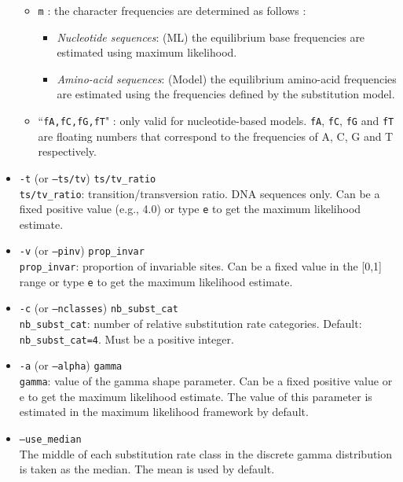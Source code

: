 \documentclass[a4paper,12pt]{article}
\newcommand{\x}[1]{\texttt{#1}}
\begin{document}
\begin{itemize}
\begin{itemize}
\item \x{m} : the character frequencies are determined as follows : 
\begin{itemize}
\item {\it Nucleotide sequences}: (ML) the equilibrium base frequencies are estimated using maximum
  likelihood.
\item {\it Amino-acid sequences}: (Model) the equilibrium amino-acid frequencies are estimated using
                 the frequencies defined by the substitution model.
\end{itemize}

\item ``\x{fA,fC,fG,fT}" : only valid for nucleotide-based models. \x{fA}, \x{fC}, \x{fG} and \x{fT} are floating numbers that 
correspond to the frequencies of A, C, G and T respectively.
\end{itemize}  

\item \x{-t} (or \x{--ts/tv}) \x{ts/tv\_ratio} \index{$\kappa$}\\
\x{ts/tv\_ratio}: transition/transversion ratio. DNA sequences only. Can be a fixed positive value
(e.g., 4.0) or type \x{e} to get the maximum likelihood estimate.

\item \x{-v} (or \x{--pinv}) \x{prop\_invar} \\
\x{prop\_invar}: proportion of invariable sites. Can be a fixed value in the [0,1] range or type \x{e} to get the maximum likelihood estimate.

\item \x{-c} (or \x{--nclasses}) \x{nb\_subst\_cat} \\
\x{nb\_subst\_cat}: number of relative substitution rate categories. Default: \x{nb\_subst\_cat=4}. Must be a positive integer.

\item \x{-a} (or \x{--alpha}) \x{gamma}  \\
\x{gamma}: value of the gamma shape parameter. Can be a fixed positive value or e to get the maximum
likelihood estimate. The value of this parameter is estimated in the maximum likelihood framework by default.

\item \x{--use\_median}  \\
The middle of each substitution rate class in the discrete gamma distribution is taken as the
median. The mean is used by default.


\end{itemize}
\end{document}
